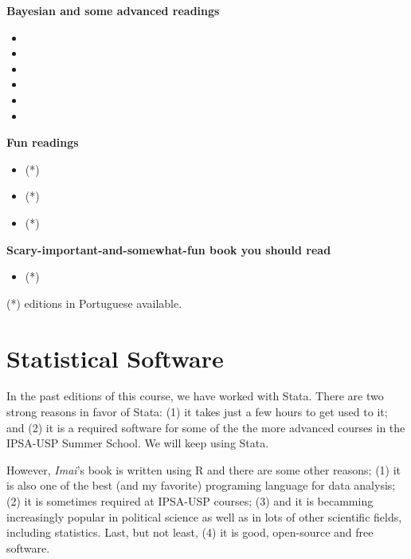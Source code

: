 \documentclass[a4paper,11pt]{article}
\begin{document}
\textbf{Bayesian and some advanced readings}

\begin{itemize}
  \item {}
  \item {}
  \item {}
  \item {}
  \item {}
  \item {}
\end{itemize}

\textbf{Fun readings}

\begin{itemize}
  \item {} (*)
  \item {} (*)
  \item {} (*)
\end{itemize}

\textbf{Scary-important-and-somewhat-fun book you should read}

\begin{itemize}
  \item {} (*)
\end{itemize}


(*) editions in Portuguese available.

\section{Statistical Software}

In the past editions of this course, we have worked with Stata. There are two strong reasons in favor of Stata: (1) it takes just a few hours to get used to it; and (2) it is a required software for some of the the more advanced courses in the IPSA-USP Summer School. We will keep using Stata.

However, \emph{Imai}'s book is written using R and there are some other reasons; (1) it is also one of the best (and my favorite) programing language for data analysis; (2) it is sometimes required at IPSA-USP courses; (3) and it is becamming increasingly popular in political science as well as in lots of other scientific fields, including statistics. Last, but not least, (4)  it is good, open-source and free software.
\end{document}
